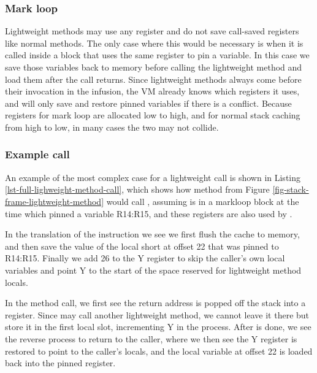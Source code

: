 \subsubsection{Mark loop}
Lightweight methods may use any register and do not save call-saved registers like normal methods. The only case where this would be necessary is when it is called inside a  block that uses the same register to pin a variable. In this case we save those variables back to memory before calling the lightweight method and load them after the call returns. Since lightweight methods always come before their invocation in the infusion, the VM already knows which registers it uses, and will only save and restore pinned variables if there is a conflict. Because registers for mark loop are allocated low to high, and for normal stack caching from high to low, in many cases the two may not collide.

\subsubsection{Example call}
An example of the most complex case for a lightweight call is shown in Listing \ref{lst-full-lighweight-method-call}, which shows how method  from Figure \ref{fig-stack-frame-lightweight-method} would call , assuming  is in a markloop block at the time which pinned a variable R14:R15, and these registers are also used by .

In the translation of the  instruction we see we first flush the cache to memory, and then save the value of the local short at offset 22 that was pinned to R14:R15. Finally we add 26 to the Y register to skip the caller's own local variables and point Y to the start of the space reserved for lightweight method locals.

In the method call, we first see the return address is popped off the stack into a register. Since  may call another lightweight method, we cannot leave it there but store it in the first local slot, incrementing Y in the process. After  is done, we see the reverse process to return to the caller, where we then see the Y register is restored to point to the caller's locals, and the local variable at offset 22 is loaded back into the pinned register.

